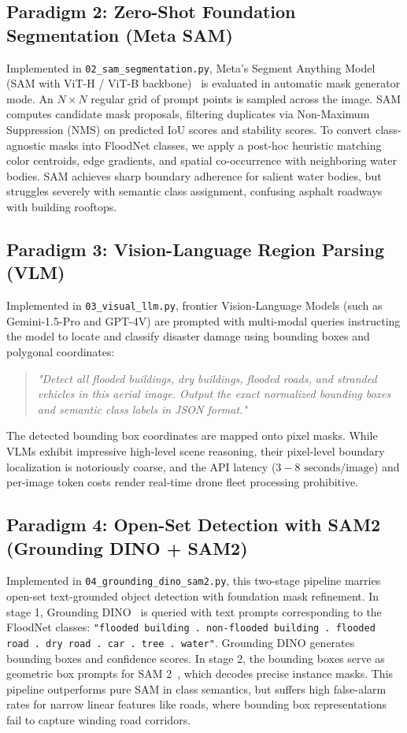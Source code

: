 \subsection{Paradigm 2: Zero-Shot Foundation Segmentation (Meta SAM)}
Implemented in \texttt{02\_sam\_segmentation.py}, Meta's Segment Anything Model (SAM with ViT-H / ViT-B backbone)~\cite{kirillov2023segment} is evaluated in automatic mask generator mode. An $N \times N$ regular grid of prompt points is sampled across the image. SAM computes candidate mask proposals, filtering duplicates via Non-Maximum Suppression (NMS) on predicted IoU scores and stability scores. To convert class-agnostic masks into FloodNet classes, we apply a post-hoc heuristic matching color centroids, edge gradients, and spatial co-occurrence with neighboring water bodies. SAM achieves sharp boundary adherence for salient water bodies, but struggles severely with semantic class assignment, confusing asphalt roadways with building rooftops.

\subsection{Paradigm 3: Vision-Language Region Parsing (VLM)}
Implemented in \texttt{03\_visual\_llm.py}, frontier Vision-Language Models (such as Gemini-1.5-Pro and GPT-4V) are prompted with multi-modal queries instructing the model to locate and classify disaster damage using bounding boxes and polygonal coordinates:
\begin{quote}
    \textit{"Detect all flooded buildings, dry buildings, flooded roads, and stranded vehicles in this aerial image. Output the exact normalized bounding boxes and semantic class labels in JSON format."}
\end{quote}
The detected bounding box coordinates are mapped onto pixel masks. While VLMs exhibit impressive high-level scene reasoning, their pixel-level boundary localization is notoriously coarse, and the API latency ($3 - 8\text{ seconds/image}$) and per-image token costs render real-time drone fleet processing prohibitive.

\subsection{Paradigm 4: Open-Set Detection with SAM2 (Grounding DINO + SAM2)}
Implemented in \texttt{04\_grounding\_dino\_sam2.py}, this two-stage pipeline marries open-set text-grounded object detection with foundation mask refinement. In stage 1, Grounding DINO~\cite{liu2023grounding} is queried with text prompts corresponding to the FloodNet classes: \texttt{"flooded building . non-flooded building . flooded road . dry road . car . tree . water"}. Grounding DINO generates bounding boxes and confidence scores. In stage 2, the bounding boxes serve as geometric box prompts for SAM 2~\cite{ravi2024sam2}, which decodes precise instance masks. This pipeline outperforms pure SAM in class semantics, but suffers high false-alarm rates for narrow linear features like roads, where bounding box representations fail to capture winding road corridors.

